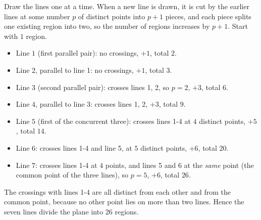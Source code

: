 Draw the lines one at a time. When a new line is drawn, it is cut by the earlier lines at some number $p$ of distinct points into $p+1$ pieces, and each piece splits one existing region into two, so the number of regions increases by $p+1$. Start with $1$ region.
\begin{itemize}
\item Line $1$ (first parallel pair): no crossings, $+1$, total $2$.
\item Line $2$, parallel to line 1: no crossings, $+1$, total $3$.
\item Line $3$ (second parallel pair): crosses lines 1, 2, so $p=2$, $+3$, total $6$.
\item Line $4$, parallel to line 3: crosses lines 1, 2, $+3$, total $9$.
\item Line $5$ (first of the concurrent three): crosses lines 1-4 at $4$ distinct points, $+5$, total $14$.
\item Line $6$: crosses lines 1-4 and line 5, at $5$ distinct points, $+6$, total $20$.
\item Line $7$: crosses lines 1-4 at $4$ points, and lines 5 and 6 at the \emph{same} point (the common point of the three lines), so $p=5$, $+6$, total $26$.
\end{itemize}
The crossings with lines 1-4 are all distinct from each other and from the common point, because no other point lies on more than two lines. Hence the seven lines divide the plane into $\boxed{26}$ regions.
